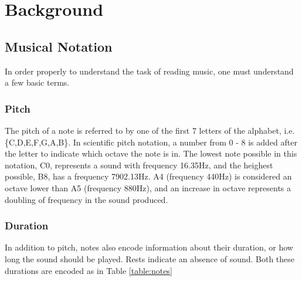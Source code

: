 ﻿\section{Background}
    \subsection{Musical Notation}
        In order properly to understand the task of reading music, one must understand a few basic terms.

        \subsubsection{Pitch}
            The pitch of a note is referred to by one of the first 7 letters of the alphabet, i.e. \{C,D,E,F,G,A,B\}.
            In scientific pitch notation, a number from 0 - 8 is added after the letter to indicate which octave the note is in.
            The lowest note possible in this notation, C0, represents a sound with frequency 16.35Hz, and the heighest possible, B8, has a frequency 7902.13Hz.
            A4 (frequency 440Hz) is considered an octave lower than A5 (frequency 880Hz), and an increase in octave represents a doubling of frequency in the sound produced.
        \subsubsection{Duration}
            In addition to pitch, notes also encode information about their duration, or how long the sound should be played. 
            Rests indicate an absence of sound. Both these durations are encoded as in Table \ref{table:notes}

